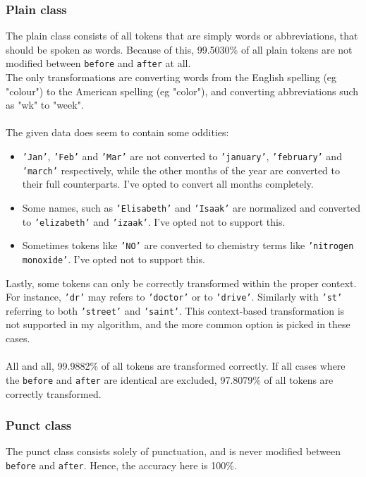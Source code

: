 \documentclass[a4paper, 9pt]{extarticle}
\newcommand{\code}{\texttt}
\newcommand{\str}[1]{\texttt{'#1'}}
\begin{document}
\subsubsection{Plain class}
The plain class consists of all tokens that are simply words or abbreviations, that should be spoken as words. Because of this, 99.5030\% of all plain tokens are not modified between \code{before} and \code{after} at all.\\
The only transformations are converting words from the English spelling (eg "colour") to the American spelling (eg "color"), and converting abbreviations such as "wk" to "week".\\\\
The given data does seem to contain some oddities:
\begin{itemize}
    \itemsep-0.3em
    \item \str{Jan}, \str{Feb} and \str{Mar} are not converted to \str{january}, \str{february} and \str{march} respectively, while the other months of the year are converted to their full counterparts. I've opted to convert all months completely.
    \item Some names, such as \str{Elisabeth} and \str{Isaak} are normalized and converted to \str{elizabeth} and \str{izaak}. I've opted not to support this.
    \item Sometimes tokens like \str{NO} are converted to chemistry terms like \str{nitrogen monoxide}. I've opted not to support this.
\end{itemize}
Lastly, some tokens can only be correctly transformed within the proper context. For instance, \str{dr} may refers to \str{doctor} or to \str{drive}. Similarly with \str{st} referring to both \str{street} and \str{saint}. This context-based transformation is not supported in my algorithm, and the more common option is picked in these cases.\\
\\
All and all, 99.9882\% of all tokens are transformed correctly. If all cases where the \code{before} and \code{after} are identical are excluded, 97.8079\% of all tokens are correctly transformed.

\subsubsection{Punct class}
The punct class consists solely of punctuation, and is never modified between \code{before} and \code{after}. Hence, the accuracy here is 100\%.
\end{document}
